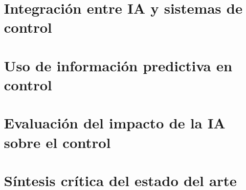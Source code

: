 \documentclass[12pt,a4paper]{report}
\begin{document}
\section{Integración entre IA y sistemas de control}

%
%
%


\section{Uso de información predictiva en control}

%
%
%


\section{Evaluación del impacto de la IA sobre el control}

%
%
%
%
%
%


\section{Síntesis crítica del estado del arte}

%
%
%
\end{document}
